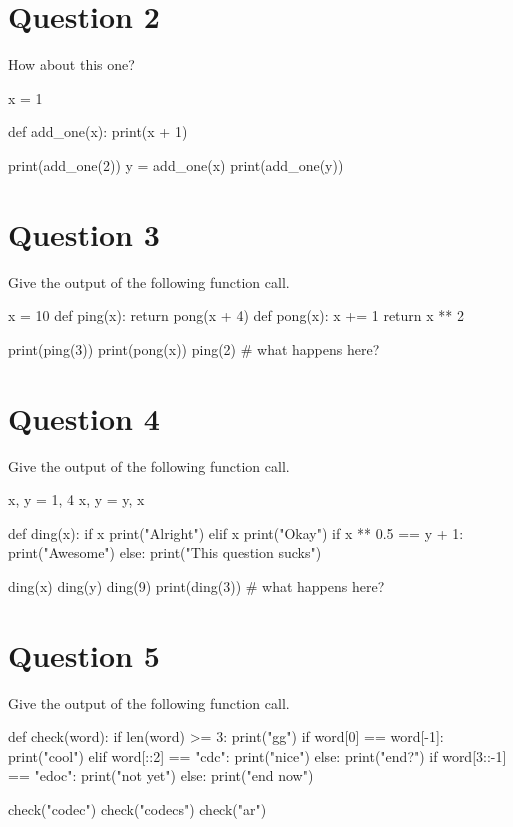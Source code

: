 \section{Question 2}
How about this one?
\begin{python}
x = 1

def add_one(x):
    print(x + 1)

print(add_one(2))
y = add_one(x)
print(add_one(y))
\end{python}

\section{Question 3}
Give the output of the following function call.
\begin{python}
x = 10
def ping(x):
    return pong(x + 4)
def pong(x):
    x += 1
    return x ** 2
  
print(ping(3))
print(pong(x))
ping(2) # what happens here?
\end{python}

\section{Question 4}
Give the output of the following function call.
\begin{python}
x, y = 1, 4
x, y = y, x

def ding(x):
    if x %
        print("Alright")
    elif x %
        print("Okay")
    if x ** 0.5 == y + 1:
        print("Awesome")
    else:
        print("This question sucks")

ding(x)
ding(y)
ding(9)
print(ding(3))  # what happens here?
\end{python}

\section{Question 5}
Give the output of the following function call.
\begin{python}
def check(word):
    if len(word) >= 3:
        print("gg")
    if word[0] == word[-1]:
        print("cool")
    elif word[::2] == "cdc":
        print("nice")
    else:
        print("end?")
    if word[3::-1] == "edoc":
        print("not yet")
    else:
        print("end now")
    
check("codec")
check("codecs")
check("ar")
\end{python}

